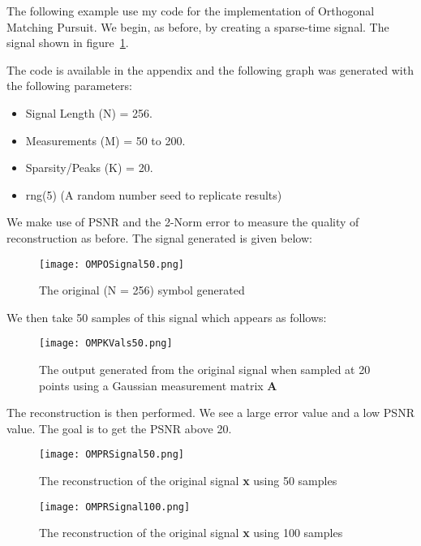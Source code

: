 \documentclass[titlepage,oneside, 12pt]{book}
\theoremstyle{break}
\begin{document}
The following example use my code for the implementation of Orthogonal Matching Pursuit. We begin, as before, by creating a sparse-time signal. The signal shown in figure~\ref{fig:OMPSig50}. 

The code is available in the appendix and the following graph was generated with the following parameters:

\begin{itemize}
\item Signal Length (N) = 256.
\item Measurements (M) = 50 to 200. 
\item Sparsity/Peaks (K) = 20.
\item rng(5) (A random number seed to replicate results)
\end{itemize}

We make use of PSNR and the 2-Norm error to measure the quality of reconstruction as before. The signal generated is given below:

\begin{figure}[h]
\centering
\centerline{\texttt{[image: OMPOSignal50.png]}}
\caption{The original (N = 256) symbol generated}
\label{fig:OMPSig50}
\end{figure}

We then take 50 samples of this signal which appears as follows:

\begin{figure}[H]
\centering
\centerline{\texttt{[image: OMPKVals50.png]}}
\caption{The output generated from the original signal when sampled at 20 points using a Gaussian measurement matrix \textbf{A} }
\label{fig:OMPSig50KVal}
\end{figure}

The reconstruction is then performed. We see a large error value and a low PSNR value. The goal is to get the PSNR above 20.

\begin{figure}[H]
\centering
\centerline{\texttt{[image: OMPRSignal50.png]}}
\caption{The reconstruction of the original signal \textbf{x} using 50 samples}
\label{fig:OMPSig50R}
\end{figure}

\begin{figure}[H]
\centering
\centerline{\texttt{[image: OMPRSignal100.png]}}
\caption{The reconstruction of the original signal \textbf{x} using 100 samples}
\label{fig:OMPSig100R}
\end{figure}
\end{document}
